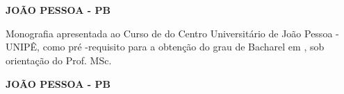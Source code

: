 \documentclass{tcc}
\begin{document}
\pagestyle{empty} %
\leading{1.5pt}


\begin{center}
	\large{\bf \cabecalhocapa}\\

	\vspace{10em}

	\begin{center}
		\bf \theauthor
	\end{center}

	\vspace{10em}

	\large{\bf \thetitle}\\
\end{center}

\vspace{1em}

\vfill

\vspace{2in}

\begin{center}
	\bf JOÃO PESSOA - PB \\
	\the\year
\end{center}

\afterpage{\addtocounter{page}{1}} %

\newpage
\vspace{2in}
\begin{center}
	\large{\bf\thetitle}%
\end{center}

\vspace{2in}



\begin{quoting}[rightmargin=0cm,leftmargin=7.83cm]
	Monografia apresentada ao Curso de \nomedocurso
	do Centro Universitário de João Pessoa - UNIPÊ,
	como pré -requisito para a obtenção do grau de
	Bacharel em \titulobar, 
	sob orientação do Prof. MSc. \orientador

	\vspace{1in}
\end{quoting}

\vfill
\begin{center}
	\bf JOÃO PESSOA - PB \\
	\the\year
\end{center}
\begin{center}
	\bf\large \theauthor
\end{center}
\newpage
\end{document}
